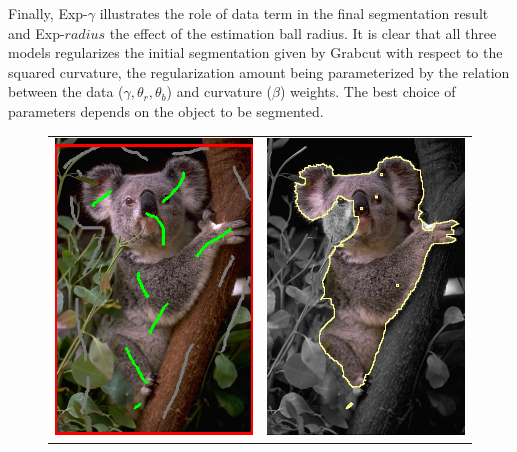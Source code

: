Finally, Exp-$\gamma$ illustrates the role of data term in the final segmentation result and Exp-$radius$ the effect of the estimation ball radius. It is clear that all three models regularizes the initial segmentation given by Grabcut with respect to the squared curvature, the regularization amount being parameterized by the relation between the data ($\gamma, \theta_r, \theta_b$) and curvature ($\beta$) weights. The best choice of parameters depends on the object to be segmented.


\begin{figure}
\centering
\begin{tabular}{cc}
\includegraphics[scale=0.4]{figures/chapter9/segmentation/seeds.png} &
\includegraphics[scale=0.4]{figures/chapter9/segmentation/gc-seg.png}

\end{tabular}
\end{figure}
